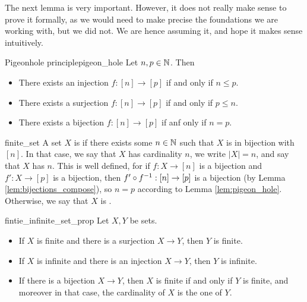 The next lemma is very important. However, it does not really make sense to prove it formally, as we would need to make precise the foundations we are working with, but we did not. We are hence assuming it, and hope it makes sense intuitively.
\begin{clem}{Pigeonhole principle}{pigeon_hole}
    Let \( n, p \in \mathbb{N} \). Then
    \begin{itemize}
        \item There exists an injection \( f : [n] \to [p] \) if and only if \( n \le p \).
        \item There exists a surjection \( f : [n] \to [p] \) if and only if \( p \le n \).
        \item There exists a bijection \( f : [n] \to [p] \) if anf only if \( n = p \).
    \end{itemize}
\end{clem}

\begin{cdef}{}{finite_set}
    A set \( X \) is  if there exists some \( n \in \mathbb{N} \) such that \( X \) is in bijection with \( [n] \). In that case, we say that \( X \) has cardinality \( n \), we write \( |X| = n \), and say that \( X \) has  \( n \). This is well defined, for if \( f : X \to [n] \) is a bijection and \( f' :  X \to [p] \) is a bijection, then \( f' \circ {f}^{-1} : [n] \to [p]  \) is a bijection (by Lemma \ref{lem:bijections_compose}), so \( n = p \) according to Lemma \ref{lem:pigeon_hole}.
    Otherwise, we say that \( X \) is .
\end{cdef}


\begin{cexp}{}{fintie_infinite_set_prop}
    Let \( X, Y \) be sets. 
    \begin{itemize}
        \item If \( X \) is finite and there is a surjection \( X \to Y \), then \( Y \) is finite.
        \item If \( X \) is infinite and there is an injection \( X \to Y \), then \( Y \) is infinite.
        \item If there is a bijection \( X \to Y \), then \( X \) is finite if and only if \( Y \) is finite, and moreover in that case, the cardinality of \( X \) is the one of \( Y \).
    \end{itemize}  
\end{cexp}

